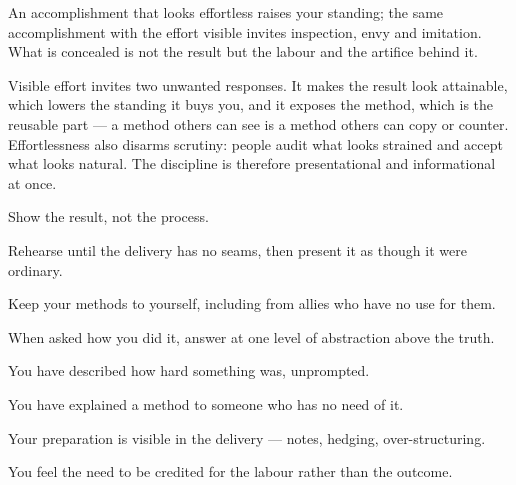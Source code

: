 


\begin{core}
An accomplishment that looks effortless raises your standing; the same accomplishment with the effort visible invites inspection, envy and imitation. What is concealed is not the result but the labour and the artifice behind it.
\end{core}

\begin{mechanism}
Visible effort invites two unwanted responses. It makes the result look attainable, which lowers the standing it buys you, and it exposes the method, which is the reusable part --- a method others can see is a method others can copy or counter. Effortlessness also disarms scrutiny: people audit what looks strained and accept what looks natural. The discipline is therefore presentational and informational at once.
\end{mechanism}

\begin{application}
  \item Show the result, not the process.
  \item Rehearse until the delivery has no seams, then present it as though it were ordinary.
  \item Keep your methods to yourself, including from allies who have no use for them.
  \item When asked how you did it, answer at one level of abstraction above the truth.
\end{application}

\begin{feedback}
  \item You have described how hard something was, unprompted.
  \item You have explained a method to someone who has no need of it.
  \item Your preparation is visible in the delivery --- notes, hedging, over-structuring.
  \item You feel the need to be credited for the labour rather than the outcome.
\end{feedback}


